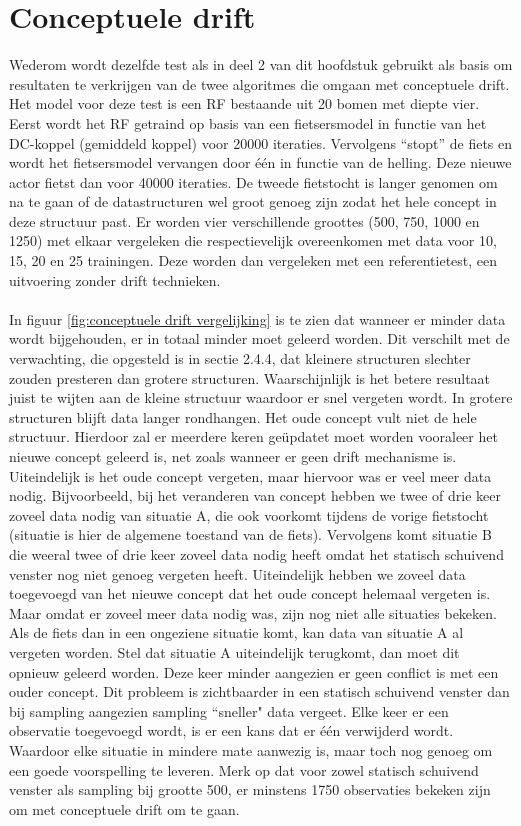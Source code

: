 \section{Conceptuele drift}
Wederom wordt dezelfde test als in deel 2 van dit hoofdstuk gebruikt als basis om resultaten te verkrijgen van de twee algoritmes die omgaan met conceptuele drift. Het model voor deze test is een RF bestaande uit 20 bomen met diepte vier. Eerst wordt het RF getraind op basis van een fietsersmodel in functie van het DC-koppel (gemiddeld koppel) voor 20000 iteraties. Vervolgens “stopt” de fiets en wordt het fietsersmodel vervangen door één in functie van de helling. Deze nieuwe actor fietst dan voor 40000 iteraties. De tweede fietstocht is langer genomen om na te gaan of de datastructuren wel groot genoeg zijn zodat het hele concept in deze structuur past. Er worden vier verschillende groottes (500, 750, 1000 en 1250) met elkaar vergeleken die respectievelijk overeenkomen met data voor 10, 15, 20 en 25 trainingen. Deze worden dan vergeleken met een referentietest, een uitvoering zonder drift technieken. 
\\\\
In figuur \ref{fig:conceptuele drift vergelijking} is te zien dat wanneer er minder data wordt bijgehouden, er in totaal minder moet geleerd worden. Dit verschilt met de verwachting, die opgesteld is in sectie 2.4.4, dat kleinere structuren slechter zouden presteren dan grotere structuren. Waarschijnlijk is het betere resultaat juist te wijten aan de kleine structuur waardoor er snel vergeten wordt. In grotere structuren blijft data langer rondhangen. Het oude concept vult niet de hele structuur. Hierdoor zal er meerdere keren geüpdatet moet worden vooraleer het nieuwe concept geleerd is, net zoals wanneer er geen drift mechanisme is. Uiteindelijk is het oude concept vergeten, maar hiervoor was er veel meer data nodig. Bijvoorbeeld, bij het veranderen van concept hebben we twee of drie keer zoveel data nodig van situatie A, die ook voorkomt tijdens de vorige fietstocht (situatie is hier de algemene toestand van de fiets). Vervolgens komt situatie B die weeral twee of drie keer zoveel data nodig heeft omdat het statisch schuivend venster nog niet genoeg vergeten heeft. Uiteindelijk hebben we zoveel data toegevoegd van het nieuwe concept dat het oude concept helemaal vergeten is. Maar omdat er zoveel meer data nodig was, zijn nog niet alle situaties bekeken. Als de fiets dan in een ongeziene situatie komt, kan data van situatie A al vergeten worden. Stel dat situatie A uiteindelijk terugkomt, dan moet dit opnieuw geleerd worden. Deze keer minder aangezien er geen conflict is met een ouder concept. Dit probleem is zichtbaarder in een statisch schuivend venster dan bij sampling aangezien sampling ``sneller" data vergeet. Elke keer er een observatie toegevoegd wordt, is er een kans dat er één verwijderd wordt. Waardoor elke situatie in mindere mate aanwezig is, maar toch nog genoeg om een goede voorspelling te leveren. Merk op dat voor zowel statisch schuivend venster als sampling bij grootte 500, er minstens 1750 observaties bekeken zijn om met conceptuele drift om te gaan.

